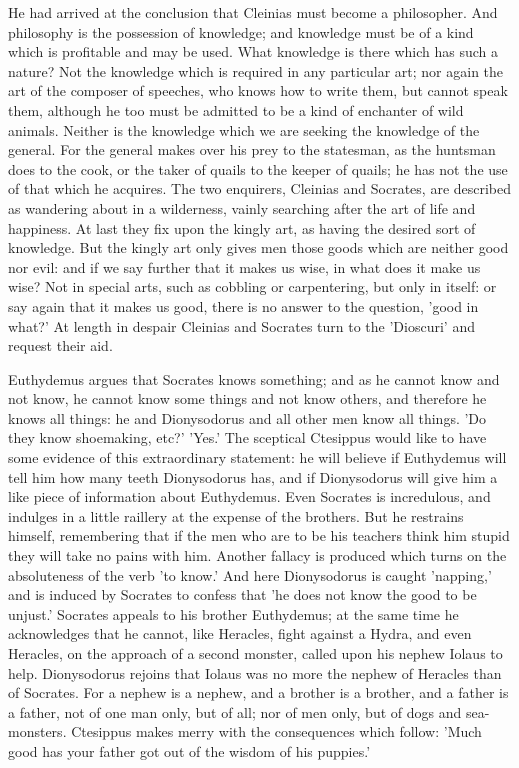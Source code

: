 \documentclass[11pt,letter]{article}
\begin{document}
\par  He had arrived at the conclusion that Cleinias must become a philosopher. And philosophy is the possession of knowledge; and knowledge must be of a kind which is profitable and may be used. What knowledge is there which has such a nature? Not the knowledge which is required in any particular art; nor again the art of the composer of speeches, who knows how to write them, but cannot speak them, although he too must be admitted to be a kind of enchanter of wild animals. Neither is the knowledge which we are seeking the knowledge of the general. For the general makes over his prey to the statesman, as the huntsman does to the cook, or the taker of quails to the keeper of quails; he has not the use of that which he acquires. The two enquirers, Cleinias and Socrates, are described as wandering about in a wilderness, vainly searching after the art of life and happiness. At last they fix upon the kingly art, as having the desired sort of knowledge. But the kingly art only gives men those goods which are neither good nor evil: and if we say further that it makes us wise, in what does it make us wise? Not in special arts, such as cobbling or carpentering, but only in itself: or say again that it makes us good, there is no answer to the question, 'good in what?' At length in despair Cleinias and Socrates turn to the 'Dioscuri' and request their aid.

\par  Euthydemus argues that Socrates knows something; and as he cannot know and not know, he cannot know some things and not know others, and therefore he knows all things: he and Dionysodorus and all other men know all things. 'Do they know shoemaking, etc?' 'Yes.' The sceptical Ctesippus would like to have some evidence of this extraordinary statement: he will believe if Euthydemus will tell him how many teeth Dionysodorus has, and if Dionysodorus will give him a like piece of information about Euthydemus. Even Socrates is incredulous, and indulges in a little raillery at the expense of the brothers. But he restrains himself, remembering that if the men who are to be his teachers think him stupid they will take no pains with him. Another fallacy is produced which turns on the absoluteness of the verb 'to know.' And here Dionysodorus is caught 'napping,' and is induced by Socrates to confess that 'he does not know the good to be unjust.' Socrates appeals to his brother Euthydemus; at the same time he acknowledges that he cannot, like Heracles, fight against a Hydra, and even Heracles, on the approach of a second monster, called upon his nephew Iolaus to help. Dionysodorus rejoins that Iolaus was no more the nephew of Heracles than of Socrates. For a nephew is a nephew, and a brother is a brother, and a father is a father, not of one man only, but of all; nor of men only, but of dogs and sea-monsters. Ctesippus makes merry with the consequences which follow: 'Much good has your father got out of the wisdom of his puppies.'
\end{document}
